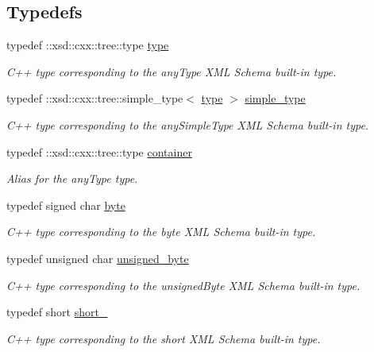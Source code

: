 \subsection*{Typedefs}
\begin{DoxyCompactItemize}
\item 
typedef \+::xsd\+::cxx\+::tree\+::type \hyperlink{namespacexml__schema_a3d277dc807f2e4ec4261dcef5c04a836}{type}
\begin{DoxyCompactList}\small\item\em C++ type corresponding to the any\+Type X\+M\+L Schema built-\/in type. \end{DoxyCompactList}\item 
typedef \+::xsd\+::cxx\+::tree\+::simple\+\_\+type$<$ \hyperlink{namespacexml__schema_a3d277dc807f2e4ec4261dcef5c04a836}{type} $>$ \hyperlink{namespacexml__schema_a44789bb4367951bcf8ae867cb983324d}{simple\+\_\+type}
\begin{DoxyCompactList}\small\item\em C++ type corresponding to the any\+Simple\+Type X\+M\+L Schema built-\/in type. \end{DoxyCompactList}\item 
typedef \+::xsd\+::cxx\+::tree\+::type \hyperlink{namespacexml__schema_a395f5179c5fc4643909d66e9ff28d8ca}{container}
\begin{DoxyCompactList}\small\item\em Alias for the any\+Type type. \end{DoxyCompactList}\item 
typedef signed char \hyperlink{namespacexml__schema_a2a462724b41fb68016d13b34f9a84b7d}{byte}
\begin{DoxyCompactList}\small\item\em C++ type corresponding to the byte X\+M\+L Schema built-\/in type. \end{DoxyCompactList}\item 
typedef unsigned char \hyperlink{namespacexml__schema_a876b68656d976c6343512f3d44fe8ca2}{unsigned\+\_\+byte}
\begin{DoxyCompactList}\small\item\em C++ type corresponding to the unsigned\+Byte X\+M\+L Schema built-\/in type. \end{DoxyCompactList}\item 
typedef short \hyperlink{namespacexml__schema_a705720c1fed1575ccdcfd21cb7ab39ab}{short\+\_\+}
\begin{DoxyCompactList}\small\item\em C++ type corresponding to the short X\+M\+L Schema built-\/in type. \end{DoxyCompactList}\item 

\end{DoxyCompactItemize}
